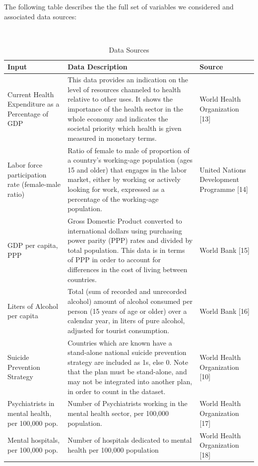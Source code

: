 \documentclass[]{article}
\begin{document}
The following table describes the the full set of variables we
considered and associated data sources:

\begin{table}[H]
\centering 
\caption{Data Sources}
\
\begin{tabular}{p{3cm}p{7cm}p{5cm}}  
\hline  
  Input & Data Description  & Source  \\   
\hline 
Current Health Expenditure as a Percentage of GDP & This data provides an indication on the level of resources channeled to health relative to other uses. It shows the importance of the health sector in the whole economy and indicates the societal priority which health is given measured in monetary terms. & World Health Organization [13]  \\   
 \hline 
Labor force participation rate (female-male ratio) & Ratio of female to male of proportion of a country’s working-age population (ages 15 and older) that engages in the labor market, either by working or actively looking for work, expressed as a percentage of the working-age population. & United Nations Development Programme [14] \\   
\hline 
GDP per capita, PPP & Gross Domestic Product converted to international dollars using purchasing power parity (PPP) rates and divided by total population. This data is in terms of PPP in order to account for differences in the cost of living between countries. & World Bank [15] \\
\hline 
Liters of Alcohol per capita &  Total (sum of recorded and unrecorded alcohol) amount of alcohol consumed per person (15 years of age or older) over a calendar year, in liters of pure alcohol, adjusted for tourist consumption. & World Bank [16] \\
\hline 
Suicide Prevention Strategy &  Countries which are known have a stand-alone national suicide prevention strategy are included as 1s, else 0. Note that the plan must be stand-alone, and may not be integrated into another plan, in order to count in the dataset. & World Health Organization [10] \\
\hline
Psychiatrists in mental health, per 100,000 pop. & Number of Psychiatrists working in the mental health sector, per 100,000 population.  & World Health Organization [17]  \\
\hline
Mental hospitals, per 100,000 pop. & Number of hospitals dedicated to mental health per 100,000 population & World Health Organization [18] \\
\hline
\end{tabular} 
\end{table}
\end{document}
